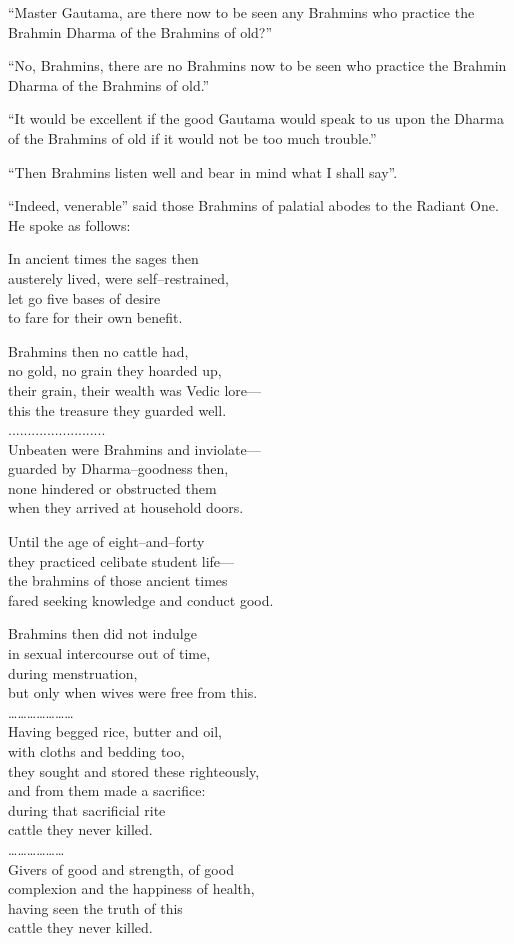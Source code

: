 “Master Gautama, are there now to be seen any Brahmins who practice the Brahmin Dharma of the Brahmins of old?”

“No, Brahmins, there are no Brahmins now to be seen who practice the Brahmin Dharma of the Brahmins of old.”

“It would be excellent if the good Gautama would speak to us upon the Dharma of the Brahmins of old if it would not be too much trouble.”

“Then Brahmins listen well and bear in mind what I shall say”.

“Indeed, venerable” said those Brahmins of palatial abodes to the Radiant One. He spoke as follows:

In ancient times the sages then\\ austerely lived, were self–restrained,\\ let go five bases of desire\\ to fare for their own benefit.

Brahmins then no cattle had,\\ no gold, no grain they hoarded up,\\ their grain, their wealth was Vedic lore—\\ this the treasure they guarded well.\\.........................\\ Unbeaten were Brahmins and inviolate—\\ guarded by Dharma–goodness then,\\ none hindered or obstructed them\\ when they arrived at household doors.

Until the age of eight–and–forty\\ they practiced celibate student life—\\ the brahmins of those ancient times\\ fared seeking knowledge and conduct good.

Brahmins then did not indulge\\ in sexual intercourse out of time,\\ during menstruation,\\ but only when wives were free from this.\\ …………………\\ Having begged rice, butter and oil,\\ with cloths and bedding too,\\ they sought and stored these righteously,\\ and from them made a sacrifice:\\ during that sacrificial rite\\ cattle they never killed.\\ ………………\\ Givers of good and strength, of good\\ complexion and the happiness of health,\\ having seen the truth of this\\ cattle they never killed.


